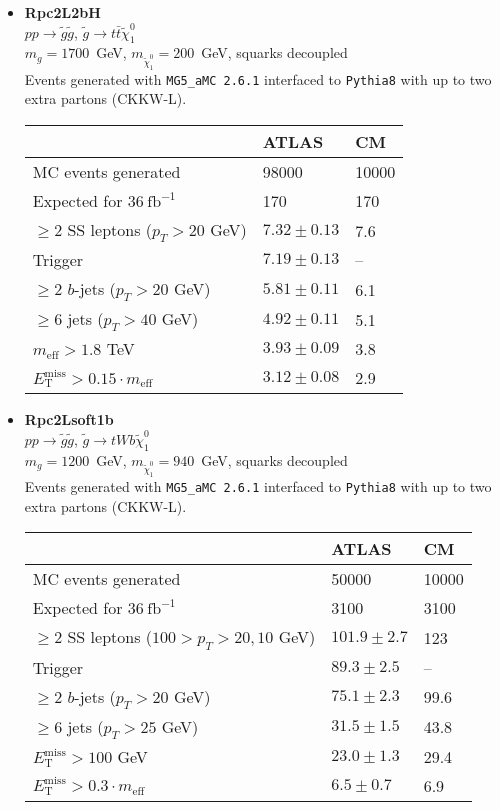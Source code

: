\documentclass[10pt,fleqn]{article}
\newcommand{\met}{E^\mathrm{miss}_\mathrm{T}}
\newcommand{\meff}{m_\mathrm{eff}}
\begin{document}
\begin{itemize}
\item \textbf{Rpc2L2bH}\\ $ p p \to \tilde{g} \tilde{g} $, $\tilde{g} \to t \bar{t} \tilde{\chi}_1^0$\\
 $m_{g} = 1700$~GeV, $m_{\tilde{\chi}_1^0} = 200$~GeV, squarks decoupled\\
 Events generated with \texttt{MG5\_aMC 2.6.1} interfaced to \texttt{Pythia8} with up to two extra partons (CKKW-L).
 \begin{tabular}{l|p{3cm}|p{3cm}} \toprule
                                           &  ATLAS           & CM  \\ \midrule
 MC events generated                       &  98000           & 10000 \\ \midrule
 Expected for $36\ \mathrm{fb}^{-1}$       &    170           & 170  \\
 $\geq 2$ SS leptons ($p_T > 20$ GeV)      & $7.32\pm 0.13$  &  7.6\\
 Trigger                                   & $7.19\pm 0.13$  &  --\\
 $\geq 2$ $b$-jets ($p_T > 20$ GeV)        & $5.81\pm 0.11$  &  6.1\\
 $\geq 6$ jets ($p_T > 40$ GeV)            & $4.92\pm 0.11$  &  5.1\\
 $\meff > 1.8$ TeV                         & $3.93\pm 0.09$  &  3.8\\
 $\met > 0.15 \cdot \meff$                 & $3.12\pm 0.08$  &  2.9\\   \bottomrule
 \end{tabular} 
 
\item \textbf{Rpc2Lsoft1b}\\ $ p p \to \tilde{g} \tilde{g} $, $\tilde{g} \to t W b \tilde{\chi}_1^0$\\
 $m_{g} = 1200$~GeV, $m_{\tilde{\chi}_1^0} = 940$~GeV, squarks decoupled\\
 Events generated with \texttt{MG5\_aMC 2.6.1} interfaced to \texttt{Pythia8} with up to two extra partons (CKKW-L).
 \begin{tabular}{l|p{3cm}|p{3cm}} \toprule
                                           &  ATLAS           & CM  \\ \midrule
 MC events generated                       &  50000           & 10000 \\ \midrule
 Expected for $36\ \mathrm{fb}^{-1}$       &  3100           & 3100  \\
 $\geq 2$ SS leptons ($100>p_T > 20, 10$ GeV)& $101.9\pm 2.7$  & 123 \\
 Trigger                                   & $89.3\pm 2.5$  &  --\\
 $\geq 2$ $b$-jets ($p_T > 20$ GeV)        & $75.1\pm 2.3$  &  99.6\\
 $\geq 6$ jets ($p_T > 25$ GeV)            & $31.5\pm 1.5$  &  43.8\\
 $\met  > 100$ GeV                         & $23.0\pm 1.3$  &  29.4\\
 $\met > 0.3 \cdot \meff$                  & $6.5 \pm 0.7$  &  6.9\\   \bottomrule
 \end{tabular}   
 

\end{itemize}
\end{document}
